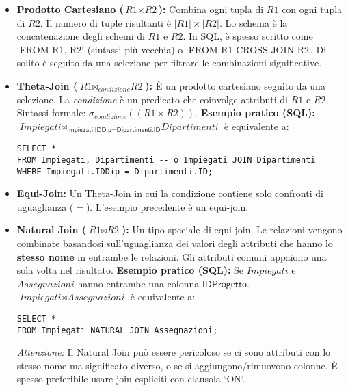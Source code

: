 \documentclass{article}
\newcommand{\Rel}[1]{\textit{#1}} %
\newcommand{\Attr}[1]{\textsf{#1}} %
\newcommand{\myselectop}[2]{\sigma_{#1}(#2)}
\newcommand{\mycartesian}{\times}
\newcommand{\mynaturaljoin}{\bowtie} %
\newcommand{\mythetajoin}[3]{#1 \bowtie_{#2} #3} %
\begin{document}
	\begin{itemize}
		\item \textbf{Prodotto Cartesiano ($\Rel{R1} \mycartesian \Rel{R2}$):}
		Combina ogni tupla di $\Rel{R1}$ con ogni tupla di $\Rel{R2}$. Il numero di tuple risultanti è $|\Rel{R1}| \times |\Rel{R2}|$. Lo schema è la concatenazione degli schemi di $\Rel{R1}$ e $\Rel{R2}$.
		In SQL, è spesso scritto come `FROM R1, R2` (sintassi più vecchia) o `FROM R1 CROSS JOIN R2`. Di solito è seguito da una selezione per filtrare le combinazioni significative.
		
		\item \textbf{Theta-Join ($\mythetajoin{\Rel{R1}}{condizione}{\Rel{R2}}$):}
		È un prodotto cartesiano seguito da una selezione. La \textit{condizione} è un predicato che coinvolge attributi di $\Rel{R1}$ e $\Rel{R2}$.
		Sintassi formale: $\myselectop{condizione}{(\Rel{R1} \mycartesian \Rel{R2})}$.
		\textbf{Esempio pratico (SQL):}
		$\mythetajoin{\Rel{Impiegati}}{\Attr{Impiegati.IDDip} = \Attr{Dipartimenti.ID}}{\Rel{Dipartimenti}}$
		è equivalente a:
		\begin{verbatim}
SELECT *
FROM Impiegati, Dipartimenti -- o Impiegati JOIN Dipartimenti
WHERE Impiegati.IDDip = Dipartimenti.ID;
		\end{verbatim}
		
		\item \textbf{Equi-Join:} Un Theta-Join in cui la condizione contiene solo confronti di uguaglianza ($=$). L'esempio precedente è un equi-join.
		
		\item \textbf{Natural Join ($\Rel{R1} \mynaturaljoin \Rel{R2}$):}
		Un tipo speciale di equi-join. Le relazioni vengono combinate basandosi sull'uguaglianza dei valori degli attributi che hanno lo \textbf{stesso nome} in entrambe le relazioni. Gli attributi comuni appaiono una sola volta nel risultato.
		\textbf{Esempio pratico (SQL):} Se $\Rel{Impiegati}$ e $\Rel{Assegnazioni}$ hanno entrambe una colonna $\Attr{IDProgetto}$.
		$\Rel{Impiegati} \mynaturaljoin \Rel{Assegnazioni}$
		è equivalente a:
		\begin{verbatim}
SELECT *
FROM Impiegati NATURAL JOIN Assegnazioni;
		\end{verbatim}
		\textit{Attenzione:} Il Natural Join può essere pericoloso se ci sono attributi con lo stesso nome ma significato diverso, o se si aggiungono/rimuovono colonne. È spesso preferibile usare join espliciti con clausola `ON`.
	\end{itemize}
	
\end{document}
